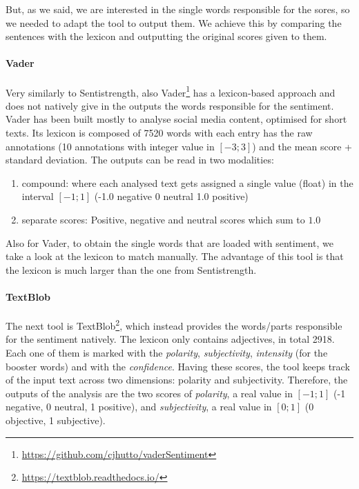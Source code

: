 But, as we said, we are interested in the single words responsible for the sores, so we needed to adapt the tool to output them. We achieve this by comparing the sentences with the lexicon and outputting the original scores given to them.


\paragraph{Vader}
Very similarly to Sentistrength, also Vader\footnote{\url{https://github.com/cjhutto/vaderSentiment}} has a lexicon-based approach and does not natively give in the outputs the words responsible for the sentiment. Vader has been built mostly to analyse social media content, optimised for short texts.
Its lexicon is composed of 7520 words with each entry has the raw annotations (10 annotations with integer value in $[-3;3]$) and the mean score + standard deviation.
The outputs can be read in two modalities:
\begin{enumerate}
    \item compound: where each analysed text gets assigned a single value (float) in the interval $[-1;1]$ (-1.0 negative 0 neutral 1.0 positive)
    \item separate scores: Positive, negative and neutral scores which sum to $1.0$
\end{enumerate}

Also for Vader, to obtain the single words that are loaded with sentiment, we take a look at the lexicon to match manually. The advantage of this tool is that the lexicon is much larger than the one from Sentistrength.



\paragraph{TextBlob}
The next tool is TextBlob\footnote{\url{ https://textblob.readthedocs.io/}}, which instead provides the words/parts responsible for the sentiment natively.
The lexicon only contains adjectives, in total 2918. Each one of them is marked with the \emph{polarity}, \emph{subjectivity}, \emph{intensity} (for the booster words) and with the \emph{confidence}. Having these scores, the tool keeps track of the input text across two dimensions: polarity and subjectivity.
Therefore, the outputs of the analysis are the two scores of \emph{polarity}, a real value in $[-1;1]$ (-1 negative, 0 neutral, 1 positive), and \emph{subjectivity}, a real value in $[0;1]$ (0 objective, 1 subjective).

